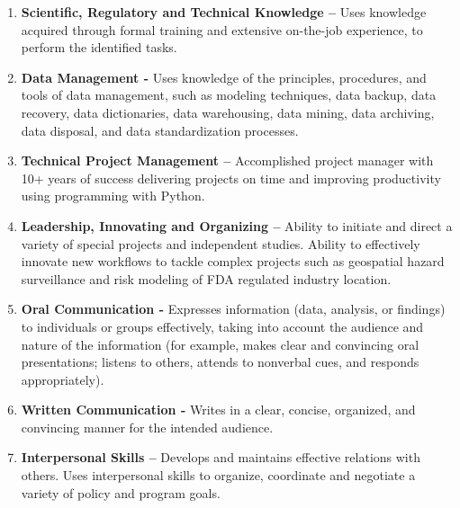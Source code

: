 \documentclass[letterpaper]{twentysecondcv} %
\begin{document}
\begin{multicols}{2}

\begin{enumerate}
   \item  \textbf{Scientific, Regulatory and Technical Knowledge –} Uses knowledge acquired through formal training and extensive on-the-job experience, to perform the identified tasks.

    \item \textbf{Data Management -} Uses knowledge of the principles, procedures, and tools of data management, such as modeling techniques, data backup, data recovery, data dictionaries, data warehousing, data mining, data archiving, data disposal, and data standardization processes.
    \item \textbf{Technical Project Management –} Accomplished project manager with 10+ years of success delivering projects on time and improving productivity using programming with Python.
    \item \textbf{Leadership, Innovating and Organizing –} Ability to initiate and direct a variety of special projects and independent studies. Ability to effectively innovate new workflows to tackle complex projects such as geospatial hazard surveillance and risk modeling of FDA regulated industry location.

    \item \textbf{Oral Communication -} Expresses information (data, analysis, or findings) to individuals or groups effectively, taking into account the audience and nature of the information (for example, makes clear and convincing oral presentations; listens to others, attends to nonverbal cues, and responds appropriately).

   \item \textbf{Written Communication -} Writes in a clear, concise, organized, and convincing manner for the intended audience.

   \item \textbf{Interpersonal Skills –} Develops and maintains effective relations with others. Uses interpersonal skills to organize, coordinate and negotiate a variety of policy and program goals.
  
   
    
\end{enumerate}
\end{multicols}
\end{document}
